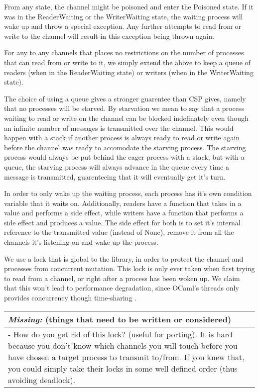 \documentclass[a4paper,12pt]{article}
\newcommand{\missing}[1]{
\begin{tabular}{|p{11cm}|}
\hline
\emph{Missing:} {\scriptsize (things that need to be written or considered)} \\
\hline
#1
\hline
\end{tabular}
}
\begin{document}
From any state, the channel might be poisoned and enter the Poisoned state. If it was in the
ReaderWaiting or the WriterWaiting state, the waiting process will wake up and throw a special
exception. Any further attempts to read from or write to the channel will result in this 
exception being thrown again.

For any to any channels that places no restrictions on the number of processes that can read
from or write to it, we simply extend the above to keep a queue of readers (when in the 
ReaderWaiting state) or writers (when in the WriterWaiting state).

The choice of using a queue gives a stronger guarentee than CSP gives, namely that no processes
will be starved. By starvation we mean to say that a process waiting to read or write on the
channel can be blocked indefinately even though an infinite number of messages is transmitted
over the channel. This would happen with a stack if another process is always ready to read or 
write again before the channel was ready to accomodate the starving process. The starving process
would always be put behind the eager process with a stack, but with a queue, the starving process
will always advance in the queue every time a message is transmitted, guarenteeing that it will
eventually get it's turn.

In order to only wake up the waiting process, each process has it's own condition variable that
it waits on. Additionally, readers have a function that takes in a value and performs a side 
effect, while writers have a function that performs a side effect and produces a value. The side
effect for both is to set it's internal reference to the transmitted value (instead of None),
remove it from all the channels it's listening on and wake up the process.

We use a lock that is global to the library, in order to protect the channel and processes from
concurrent mutation. This lock is only ever taken when first trying to read from a channel, or
right after a process has been woken up. We claim that this won't lead to performance degradation,
since OCaml's threads only provides concurrency though time-sharing \cite{ocaml-threads}.

\missing{
- How do you get rid of this lock? (useful for porting). It is hard because you don't know which
channels you will touch before you have chosen a target process to transmit to/from. If you knew
that, you could simply take their locks in some well defined order (thus avoiding deadlock). \\
}
\end{document}
